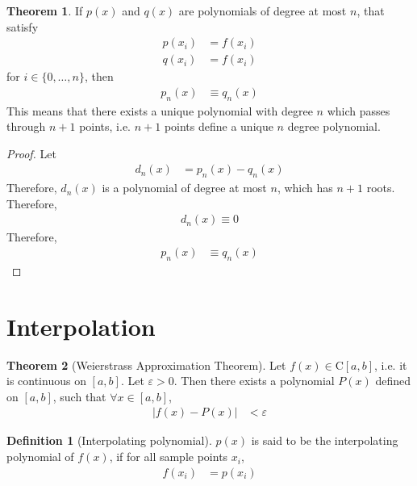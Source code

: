 \documentclass[fleqn, a4paper, 12pt, twoside, titlepage]{article}
\theoremstyle{definition}
\newtheorem{definition}{Definition}
\theoremstyle{theorem}
\newtheorem{theorem}{Theorem}
\begin{document}
\begin{theorem}
	If $p(x)$ and $q(x)$ are polynomials of degree at most $n$, that satisfy
	\begin{align*}
		p(x_i) &= f(x_i)\\
		q(x_i) &= f(x_i)
	\end{align*}
	for $i \in \{0,\dots,n\}$, then
	\begin{align*}
		p_n(x) &\equiv q_n(x)
	\end{align*}
	This means that there exists a unique polynomial with degree $n$ which passes through $n + 1$ points, i.e. $n + 1$ points define a unique $n$ degree polynomial.
\end{theorem}

\begin{proof}
	Let
	\begin{align*}
		d_n(x) &= p_n(x) - q_n(x)
	\end{align*}
	Therefore, $d_n(x)$ is a polynomial of degree at most $n$, which has $n + 1$ roots.
	Therefore,
	\begin{align*}
		d_n(x) \equiv 0
	\end{align*}
	Therefore,
	\begin{align*}
		p_n(x) &\equiv q_n(x)
	\end{align*}
\end{proof}

\section{Interpolation}

\begin{theorem}[Weierstrass Approximation Theorem]
	Let $f(x) \in \mathrm{C} [a,b]$, i.e. it is continuous on $[a,b]$.
	Let $\varepsilon > 0$.
	Then there exists a polynomial $P(x)$ defined on $[a,b]$, such that $\forall x \in [a,b]$,
	\begin{align*}
		\left| f(x) - P(x) \right| &< \varepsilon
	\end{align*}
	\label{Weierstrass_Approximation_Theorem}
\end{theorem}

\begin{definition}[Interpolating polynomial]
	$p(x)$ is said to be the interpolating polynomial of $f(x)$, if for all sample points $x_i$,
	\begin{align*}
		f(x_i) & = p(x_i)
	\end{align*}
\end{definition}
\end{document}
